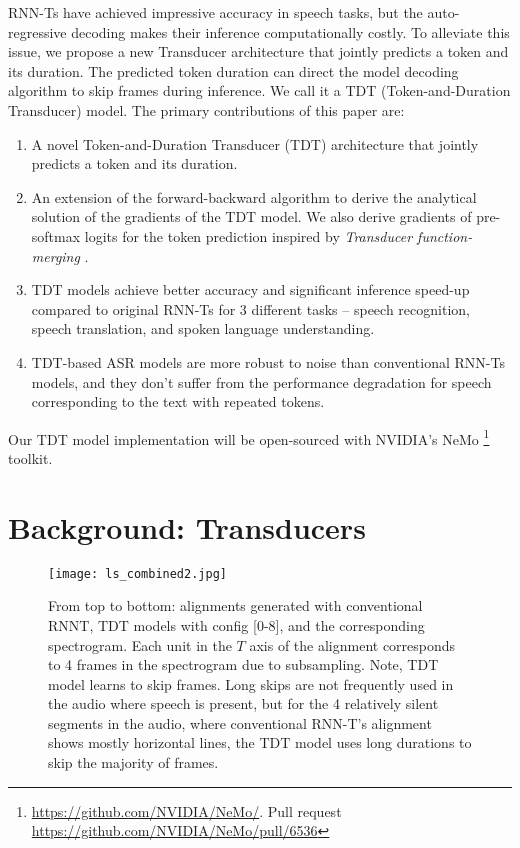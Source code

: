 \documentclass{article}
\begin{document}
RNN-Ts have achieved impressive accuracy in speech tasks, but
the auto-regressive decoding makes their inference computationally costly. To alleviate this issue, we propose a new Transducer architecture that jointly predicts  a token and its duration. The predicted token duration 
can direct the model decoding algorithm to skip frames during inference.  We call it a TDT (Token-and-Duration Transducer) model.
The primary contributions of this paper are:
\begin{enumerate}
    \item A novel Token-and-Duration Transducer (TDT) architecture that jointly predicts a token and its duration.
    \item An  extension of the forward-backward algorithm  to derive the analytical solution of
the gradients of the TDT model. We also derive gradients of pre-softmax logits for the token prediction inspired by \emph{Transducer function-merging} \cite{li2019improving}. 
    \item TDT models achieve better accuracy and significant inference speed-up compared to original RNN-Ts for 3 different tasks -- speech recognition, speech translation,  and spoken language understanding.
    \item TDT-based ASR  models are more robust to noise than conventional RNN-Ts models, and  they don't suffer from the performance degradation for speech corresponding to the text with repeated tokens.
\end{enumerate}
Our TDT model implementation will be open-sourced with NVIDIA's NeMo \footnote{\url{https://github.com/NVIDIA/NeMo/}. Pull request \url{https://github.com/NVIDIA/NeMo/pull/6536}} toolkit.




\section{Background: Transducers} \label{background}







\begin{figure}
    \centering
    \texttt{[image: ls\_combined2.jpg]}
    \caption{From top to bottom: alignments generated with conventional RNNT, TDT models with config  [0-8], and the corresponding spectrogram. Each unit in the $T$ axis of the alignment corresponds to 4 frames in the spectrogram due to subsampling. Note, TDT model learns to skip frames. Long skips are not frequently used in the audio where speech is present, but for the 4 relatively silent segments in the audio, where conventional RNN-T's alignment shows mostly horizontal lines, the TDT model uses long durations to skip the majority of frames. }
    \label{first_figure}
\end{figure}
\end{document}
